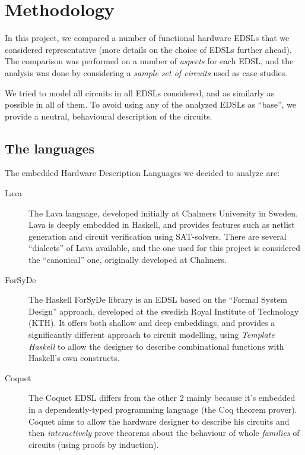 \documentclass[a4paper]{article}
\begin{document}
    \section{Methodology}
    \label{sec:methods}
        In this project, we compared a number of functional hardware EDSLs that we considered
        representative (more details on the choice of EDSLs further ahead). The comparison was
        performed on a number of \emph{aspects} for each EDSL, and the analysis was done by
        considering a \emph{sample set of circuits} used as case studies.

        We tried to model all circuits in all EDSLs considered, and as similarly as possible in
        all of them. To avoid using any of the analyzed EDSLs as ``base'', we provide a neutral,
        behavioural description of the circuits.

        \newpage

        \subsection{The languages}
        \label{subsec:languages}
            The embedded Hardware Description Languages we decided to analyze are:
            \begin{description}
                \item[Lava] The Lava\cite{lava1998} language, developed initially at Chalmers
                    University in Sweden.  Lava is deeply embedded in Haskell, and provides features
                    such as netlist generation and circuit verification using SAT-solvers. There are
                    several ``dialects'' of Lava available, and the one used for this project is
                    considered the ``canonical'' one, originally developed at Chalmers.

                \item[ForSyDe] The Haskell ForSyDe library is an EDSL based on the ``Formal System
                    Design'' approach\cite{forsyde1999}, developed at the swedish Royal Institute of
                    Technology (KTH).  It offers both shallow and deep embeddings, and provides a
                    significantly different approach to circuit modelling, using \emph{Template
                        Haskell} to allow the designer to describe combinational functions with
                    Haskell's own constructs.

                \item[Coquet] The Coquet\cite{coquet2011} EDSL differs from the other 2 mainly
                    because it's embedded in a dependently-typed programming language (the Coq theorem
                    prover). Coquet aims to allow the hardware designer to describe his circuits and
                    then \emph{interactively} prove theorems about the behaviour of whole
                    \emph{families} of circuits (using proofs by induction).
            \end{description}
\end{document}
